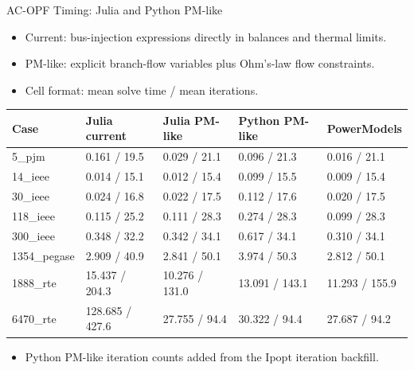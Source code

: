 \begin{frame}{AC-OPF Timing: Julia and Python PM-like}
\small
\begin{itemize}
  \item Current: bus-injection expressions directly in balances and thermal limits.
  \item PM-like: explicit branch-flow variables plus Ohm's-law flow constraints.
  \item Cell format: mean solve time / mean iterations.
\end{itemize}

\vspace{0.2em}
\begin{tabular}{lllll}
\toprule
Case & Julia current & Julia PM-like & Python PM-like & PowerModels \\
\midrule
5\_pjm & 0.161 / 19.5 & 0.029 / 21.1 & 0.096 / 21.3 & 0.016 / 21.1 \\
14\_ieee & 0.014 / 15.1 & 0.012 / 15.4 & 0.099 / 15.5 & 0.009 / 15.4 \\
30\_ieee & 0.024 / 16.8 & 0.022 / 17.5 & 0.112 / 17.6 & 0.020 / 17.5 \\
118\_ieee & 0.115 / 25.2 & 0.111 / 28.3 & 0.274 / 28.3 & 0.099 / 28.3 \\
300\_ieee & 0.348 / 32.2 & 0.342 / 34.1 & 0.617 / 34.1 & 0.310 / 34.1 \\
1354\_pegase & 2.909 / 40.9 & 2.841 / 50.1 & 3.974 / 50.3 & 2.812 / 50.1 \\
1888\_rte & 15.437 / 204.3 & 10.276 / 131.0 & 13.091 / 143.1 & 11.293 / 155.9 \\
6470\_rte & 128.685 / 427.6 & 27.755 / 94.4 & 30.322 / 94.4 & 27.687 / 94.2 \\
\bottomrule
\end{tabular}

\vspace{0.3em}
\begin{itemize}
  \item Python PM-like iteration counts added from the Ipopt iteration backfill.
\end{itemize}

\end{frame}


